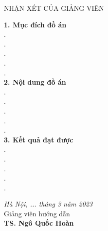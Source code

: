 \newpage
\thispagestyle{empty}
\begin{center}
    NHẬN XÉT CỦA GIẢNG VIÊN
\end{center}
\vspace{1cm}
\textbf{1. Mục đích đồ án}
\vspace{.5cm} \\
.\dotfill \\
.\dotfill \\
.\dotfill \\
.\dotfill \\
.\dotfill \\

\noindent\textbf{2. Nội dung đồ án}
\vspace{.5cm} \\
.\dotfill \\
.\dotfill \\
.\dotfill \\
.\dotfill \\
.\dotfill \\

\noindent\textbf{3. Kết quả đạt được}
\vspace{.5cm} \\
.\dotfill \\
.\dotfill \\
.\dotfill \\
.\dotfill \\
.\dotfill \\

\vspace{.5cm}
\hspace{0.5\textwidth}
\begin{minipage}{0.5\textwidth}
	\noindent\begin{center}
		\textit{Hà Nội, ... tháng 3 năm 2023} \\
		Giảng viên hướng dẫn\\ \vspace{2cm}
		\textbf{TS. Ngô Quốc Hoàn} \\
	\end{center}	
\end{minipage}
